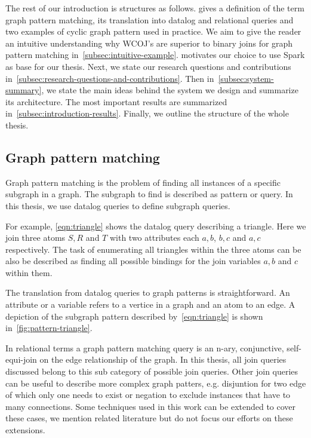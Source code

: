 The rest of our introduction is structures as follows.
 gives a definition of the term graph pattern matching, its translation into datalog and
relational queries and two examples of cyclic graph pattern used in practice.
We aim to give the reader an intuitive understanding why \textsc{WCOJ}'s are superior to binary joins for graph pattern matching
in~\cref{subsec:intuitive-example}.
 motivates our choice to use Spark as base for our thesis.
Next, we state our research questions and contributions in~\cref{subsec:research-questions-and-contributions}.
Then in~\cref{subsec:system-summary}, we state the main ideas behind the system we design and summarize its architecture.
The most important results are summarized in~\cref{subsec:introduction-results}.
Finally, we outline the structure of the whole thesis.

\subsection{Graph pattern matching}\label{subsec:graph-pattern-matching}
Graph pattern matching is the problem of finding all instances of a specific subgraph in a graph.
The subgraph to find is described as pattern or query.
In this thesis, we use datalog queries to define subgraph queries.

For example, \cref{eqn:triangle} shows the datalog query describing a triangle.
Here we join three atoms $S, R$ and $T$ with two attributes each $a, b$, $b, c$ and $a, c$ respectively.
The task of enumerating all triangles within the three atoms can be also be described as finding all possible
bindings for the join variables $a, b$ and $c$ within them.

The translation from datalog queries to graph patterns is straightforward.
An attribute or a variable refers to a vertice in a graph and an atom to an edge.
A depiction of the subgraph pattern described by~\cref{eqn:triangle} is shown in~\cref{fig:pattern-triangle}.

In relational terms a graph pattern matching query is an n-ary, conjunctive, self-equi-join on the edge relationship of the graph.
In this thesis, all join queries discussed belong to this sub category of possible join queries.
Other join queries can be useful to describe more complex graph patters, e.g. disjuntion for two edge of which only one needs to
exist or negation to exclude instances that have to many connections.
Some techniques used in this work can be extended to cover these cases, we mention related literature but do not focus
our efforts on these extensions.

